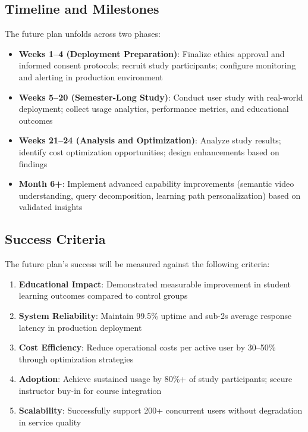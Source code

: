 \subsection{Timeline and Milestones}

The future plan unfolds across two phases:

\begin{itemize}
    \item \textbf{Weeks 1--4 (Deployment Preparation)}: Finalize ethics approval and informed consent protocols; recruit study participants; configure monitoring and alerting in production environment
    \item \textbf{Weeks 5--20 (Semester-Long Study)}: Conduct user study with real-world deployment; collect usage analytics, performance metrics, and educational outcomes
    \item \textbf{Weeks 21--24 (Analysis and Optimization)}: Analyze study results; identify cost optimization opportunities; design enhancements based on findings
    \item \textbf{Month 6+}: Implement advanced capability improvements (semantic video understanding, query decomposition, learning path personalization) based on validated insights
\end{itemize}

\subsection{Success Criteria}

The future plan's success will be measured against the following criteria:

\begin{enumerate}
    \item \textbf{Educational Impact}: Demonstrated measurable improvement in student learning outcomes compared to control groups
    \item \textbf{System Reliability}: Maintain 99.5\% uptime and sub-2s average response latency in production deployment
    \item \textbf{Cost Efficiency}: Reduce operational costs per active user by 30--50\% through optimization strategies
    \item \textbf{Adoption}: Achieve sustained usage by 80\%+ of study participants; secure instructor buy-in for course integration
    \item \textbf{Scalability}: Successfully support 200+ concurrent users without degradation in service quality
\end{enumerate}

